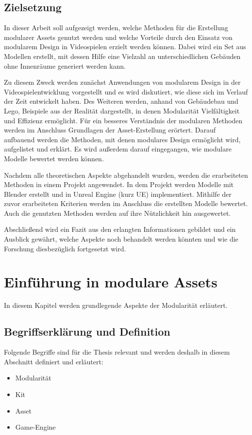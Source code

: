 \section{Zielsetzung}
In dieser Arbeit soll aufgezeigt werden, welche Methoden für die Erstellung modularer Assets genutzt werden und welche Vorteile durch den Einsatz von modularem Design in Videospielen erzielt werden können. Dabei wird ein Set aus Modellen erstellt, mit dessen Hilfe eine Vielzahl an unterschiedlichen Gebäuden ohne Innenräume generiert werden kann.
\par
Zu diesem Zweck werden zunächst Anwendungen von modularem Design in der Videospielentwicklung vorgestellt und es wird diskutiert, wie diese sich im Verlauf der Zeit entwickelt haben. Des Weiteren werden, anhand von Gebäudebau und Lego, Beispiele aus der Realität dargestellt, in denen Modularität Vielfältigkeit und Effizienz ermöglicht. Für ein besseres Verständnis der modularen Methoden werden im Anschluss Grundlagen der Asset-Erstellung erörtert. Darauf aufbauend werden die Methoden, mit denen modulares Design ermöglicht wird, aufgelistet und erklärt. Es wird außerdem darauf eingegangen, wie modulare Modelle bewertet werden können.
\par
Nachdem alle theoretischen Aspekte abgehandelt wurden, werden die erarbeiteten Methoden in einem Projekt angewendet. In dem Projekt werden Modelle mit Blender erstellt und in Unreal Engine (kurz UE) implementiert. Mithilfe der zuvor erarbeiteten Kriterien werden im Anschluss die erstellten Modelle bewertet. Auch die genutzten Methoden werden auf ihre Nützlichkeit hin ausgewertet.
\par
Abschließend wird ein Fazit aus den erlangten Informationen gebildet und ein Ausblick gewährt, welche Aspekte noch behandelt werden könnten und wie die Forschung diesbezüglich fortgesetzt wird.
\chapter{Einführung in modulare Assets}
In diesem Kapitel werden grundlegende Aspekte der Modularität erläutert.
\section{Begriffserklärung und Definition}
Folgende Begriffe sind für die Thesis relevant und werden deshalb in diesem Abschnitt definiert und erläutert:
\begin{itemize}
\item Modularität
\item Kit
\item Asset
\item Game-Engine
\end{itemize}
